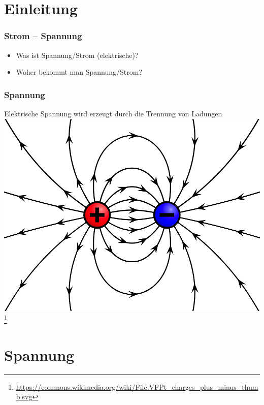 

\subtitle{Technik 02: \\
          Spannung und Strom, Wechselspannung \\[2em]}
\date{Stand 28.10.2015}



\section*{Einleitung}

\begin{frame}
    \frametitle{Strom -- Spannung}
    \begin{itemize}
		\item Was ist Spannung/Strom (elektrische)?
		\item Woher bekommt man Spannung/Strom?
    \end{itemize}
\end{frame}

\begin{frame}
    \frametitle{Spannung}
    \begin{center}
    Elektrische Spannung wird erzeugt durch die Trennung von Ladungen
		\includegraphics[width=.6\textwidth]{e02/ladung.png}
        \footnote{\tiny \url{https://commons.wikimedia.org/wiki/File:VFPt_charges_plus_minus_thumb.svg}}
    \end{center}
\end{frame}


\section*{Spannung}

